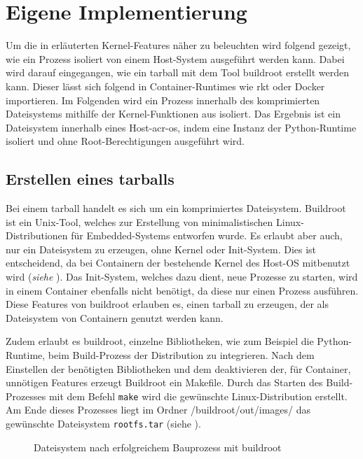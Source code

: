 \section{Eigene Implementierung}
\label{sec:eigeneImpl}
Um die in  erläuterten Kernel-Features näher zu beleuchten wird folgend gezeigt, wie ein Prozess isoliert von einem Host-System ausgeführt werden kann. Dabei wird darauf eingegangen, wie ein tarball mit dem Tool buildroot erstellt werden kann. Dieser lässt sich folgend in Container-Runtimes wie rkt oder Docker importieren. Im Folgenden wird ein Prozess innerhalb des komprimierten Dateisystems mithilfe der Kernel-Funktionen aus  isoliert. Das Ergebnis ist ein Dateisystem innerhalb eines Host-\gls{acr-os}, indem  eine Instanz der Python-Runtime isoliert und ohne Root-Berechtigungen ausgeführt wird.

\subsection{Erstellen eines tarballs}
\label{sec:tarball}
Bei einem tarball handelt es sich um ein komprimiertes Dateisystem. Buildroot ist ein Unix-Tool, welches zur Erstellung von minimalistischen Linux-Distributionen für Embedded-Systems entworfen wurde. Es erlaubt aber auch, nur ein Dateisystem zu erzeugen, ohne Kernel oder Init-System. Dies ist entscheidend, da bei Containern der bestehende Kernel des Host-OS mitbenutzt wird (\textit{siehe }). Das Init-System, welches dazu dient, neue Prozesse zu starten, wird in einem Container ebenfalls nicht benötigt, da diese nur einen Prozess ausführen. Diese Features von buildroot erlauben es, einen tarball zu erzeugen, der als Dateisystem von Containern genutzt werden kann.

Zudem erlaubt es buildroot, einzelne Bibliotheken, wie zum Beispiel die Python-Runtime, beim Build-Prozess der Distribution zu integrieren. Nach dem Einstellen der benötigten Bibliotheken und dem deaktivieren der, für Container, unnötigen Features erzeugt Buildroot ein Makefile. Durch das Starten des Build-Prozesses mit dem Befehl \texttt{make} wird die gewünschte Linux-Distribution erstellt. Am Ende dieses Prozesses liegt im Ordner /buildroot/out/images/ das gewünschte Dateisystem \texttt{rootfs.tar} (siehe ).

\begin{figure}[h]
		\centering
		\begin{minipage}{0.9\textwidth}
		\end{minipage}
		\caption{Dateisystem nach erfolgreichem Bauprozess mit buildroot}
		\label{fig:dirtreeNachBuildroot}
\end{figure} 


